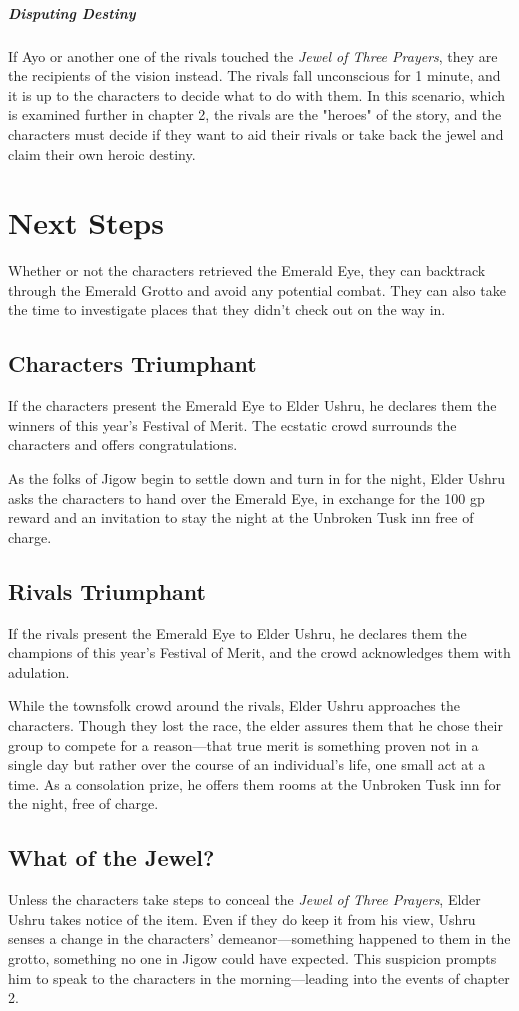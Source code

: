 \documentclass[10pt,a4paper,twoside,bg=print,twocolumn,openany,nodeprecatedcode]{dndbook}
\begin{document}
\subparagraph{Disputing Destiny}
If Ayo or another one of the rivals touched the \textit{Jewel of Three Prayers}, they are the recipients of the vision instead. The rivals fall unconscious for 1 minute, and it is up to the characters to decide what to do with them. In this scenario, which is examined further in chapter 2, the rivals are the "heroes" of the story, and the characters must decide if they want to aid their rivals or take back the jewel and claim their own heroic destiny.

\section{Next Steps}
Whether or not the characters retrieved the Emerald Eye, they can backtrack through the Emerald Grotto and avoid any potential combat. They can also take the time to investigate places that they didn't check out on the way in.

\subsection{Characters Triumphant}
If the characters present the Emerald Eye to Elder Ushru, he declares them the winners of this year's Festival of Merit. The ecstatic crowd surrounds the characters and offers congratulations.

As the folks of Jigow begin to settle down and turn in for the night, Elder Ushru asks the characters to hand over the Emerald Eye, in exchange for the 100 gp reward and an invitation to stay the night at the Unbroken Tusk inn free of charge.

\subsection{Rivals Triumphant}
If the rivals present the Emerald Eye to Elder Ushru, he declares them the champions of this year's Festival of Merit, and the crowd acknowledges them with adulation.

While the townsfolk crowd around the rivals, Elder Ushru approaches the characters. Though they lost the race, the elder assures them that he chose their group to compete for a reason—that true merit is something proven not in a single day but rather over the course of an individual's life, one small act at a time. As a consolation prize, he offers them rooms at the Unbroken Tusk inn for the night, free of charge.

\subsection{What of the Jewel?}
Unless the characters take steps to conceal the \textit{Jewel of Three Prayers}, Elder Ushru takes notice of the item. Even if they do keep it from his view, Ushru senses a change in the characters' demeanor—something happened to them in the grotto, something no one in Jigow could have expected. This suspicion prompts him to speak to the characters in the morning—leading into the events of chapter 2.
\end{document}
